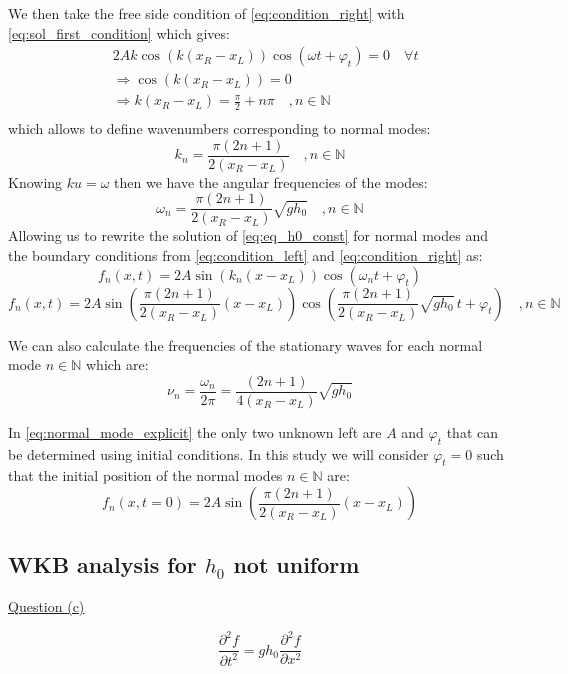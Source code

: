 We then take the free side condition of \autoref{eq:condition_right} with \autoref{eq:sol_first_condition} which gives:
\[
    \begin{aligned}
        & 2A k \cos(k(x_R-x_L))\cos(\omega t + \varphi_t) = 0 \quad \forall t \\
        & \Rightarrow \cos(k(x_R-x_L)) = 0 \\
        & \Rightarrow k(x_R-x_L) = \frac{\pi}{2} + n\pi \quad , n \in \mathbb{N} \\
    \end{aligned}
\]
which allows to define wavenumbers corresponding to normal modes:
\begin{equation}
    k_n = \frac{\pi(2n + 1)}{2(x_R-x_L)} \quad , n \in \mathbb{N}
    \label{eq:wavenumber_mode}
\end{equation}
Knowing $ku = \omega$ then we have the angular frequencies of the modes:
\begin{equation}
    \omega_n = \frac{\pi(2n + 1)}{2(x_R-x_L)} \sqrt{gh_0} \quad , n \in \mathbb{N}
    \label{eq:angular_mode}
\end{equation}
Allowing us to rewrite the solution of \autoref{eq:eq_h0_const} for normal modes and the boundary conditions from \autoref{eq:condition_left} and \autoref{eq:condition_right} as:
\begin{equation}
    f_n(x,t) = 2A\sin(k_n(x - x_L))\cos(\omega_n t + \varphi_t)
    \label{eq:normal_mode_simple}
\end{equation}
\begin{equation}
    f_n(x,t) = 2A\sin\left(\frac{\pi(2n + 1)}{2(x_R-x_L)}(x - x_L)\right)\cos\left(\frac{\pi(2n + 1)}{2(x_R-x_L)} \sqrt{gh_0} \, t + \varphi_t\right) \quad , n \in \mathbb{N}
    \label{eq:normal_mode_explicit}
\end{equation}

We can also calculate the frequencies of the stationary waves for each normal mode $n \in \mathbb{N}$ which are:
\begin{equation}
    \nu_n = \frac{\omega_n}{2\pi} = \frac{(2n + 1)}{4(x_R-x_L)} \sqrt{gh_0}
\end{equation}

In \autoref{eq:normal_mode_explicit} the only two unknown left are $A$ and $\varphi_t$ that can be determined using initial conditions. In this study we will consider $\varphi_t = 0$ such that the initial position of the normal modes $n \in \mathbb{N}$ are:
\begin{equation}
    f_n(x,t=0) = 2A\sin\left(\frac{\pi(2n + 1)}{2(x_R-x_L)}(x - x_L)\right)
    \label{eq:normal_initial}
\end{equation}


\subsection{WKB analysis for $h_0$ not uniform}
\underline{Question (c)}

\begin{equation}
    \frac{\partial^2 f}{\partial t^2} = g h_0 \frac{\partial^2 f}{\partial x^2}
    \label{eq:eq2}
\end{equation}
